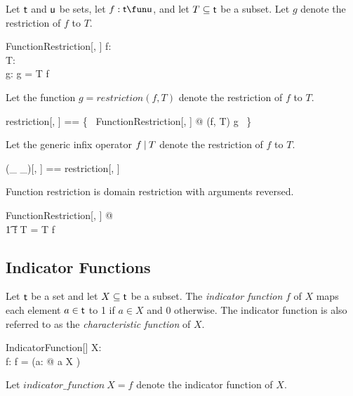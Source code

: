 \documentclass{amsart}
\begin{document}
Let $\mathsf{t}$ and $\mathsf{u}$ be sets, let $f: \genT \fun \genU$, and let $T \subseteq \mathsf{t}$ be a subset.
Let $g$ denote the restriction of $f$ to $T$.

\begin{schema}{FunctionRestriction}[\genT, \genU]
	f: \genT \fun \genU \\
	T: \power \genT \\
	g: \genT \pfun \genU
\where
	g = T \dres f
\end{schema}

Let the function  $g = restriction(f, T)$ denote the restriction of $f$ to $T$.

\begin{zed}
	restriction[\genT, \genU] == \{~ FunctionRestriction[\genT, \genU] @ (f, T) \mapsto g ~\}
\end{zed}

Let the generic infix operator $f \mathbin{|} T$ denote the restriction of $f$ to $T$.

\begin{zed}
	(\_ \restrictU \_)[\genT, \genU] == restriction[\genT, \genU]
\end{zed}

\begin{remark}
Function restriction is domain restriction with arguments reversed.
\begin{zed}
	\forall FunctionRestriction[\setT, \setU] @ \\
	\t1	f \restrictU T = T \dres f
\end{zed}
\end{remark}

\subsection{Indicator Functions}

Let $\mathsf{t}$ be a set and let $X \subseteq \mathsf{t}$ be a subset.
The \textit{indicator function}  $f$  of $X$ maps each element $a \in \mathsf{t}$ to 1 if $a \in X$ and 0 otherwise.
The indicator function is also referred to as the \textit{characteristic function} of $X$.

\begin{schema}{IndicatorFunction}[\genT]
	X: \power \genT \\
	f: \genT \fun \B
\where
	f = (\lambda a: \genT @ \IF a \in X  )
\end{schema}

Let $indicator\_function~X = f$ denote the indicator function of $X$.
\end{document}
